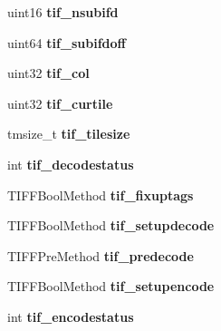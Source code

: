 \begin{DoxyCompactItemize}
\item 
\hypertarget{structtiff_add50e831319fc57d4c824f9851f96de6}{}uint16 {\bfseries tif\+\_\+nsubifd}\label{structtiff_add50e831319fc57d4c824f9851f96de6}

\item 
\hypertarget{structtiff_aa7644eeba259beb5588fd4fa606c94e3}{}uint64 {\bfseries tif\+\_\+subifdoff}\label{structtiff_aa7644eeba259beb5588fd4fa606c94e3}

\item 
\hypertarget{structtiff_aaa263854f7878e18dc08f1308d0774fe}{}uint32 {\bfseries tif\+\_\+col}\label{structtiff_aaa263854f7878e18dc08f1308d0774fe}

\item 
\hypertarget{structtiff_a56d55d1a628c741555423113efb609f1}{}uint32 {\bfseries tif\+\_\+curtile}\label{structtiff_a56d55d1a628c741555423113efb609f1}

\item 
\hypertarget{structtiff_a04cae7427954fc70e903a601486daf17}{}tmsize\+\_\+t {\bfseries tif\+\_\+tilesize}\label{structtiff_a04cae7427954fc70e903a601486daf17}

\item 
\hypertarget{structtiff_a1fc9647464968f5557456f0dd1501b91}{}int {\bfseries tif\+\_\+decodestatus}\label{structtiff_a1fc9647464968f5557456f0dd1501b91}

\item 
\hypertarget{structtiff_a1de296a43f523090ffc0ecd00237e619}{}T\+I\+F\+F\+Bool\+Method {\bfseries tif\+\_\+fixuptags}\label{structtiff_a1de296a43f523090ffc0ecd00237e619}

\item 
\hypertarget{structtiff_a85f66753c9ba6146ae353cb92df62e91}{}T\+I\+F\+F\+Bool\+Method {\bfseries tif\+\_\+setupdecode}\label{structtiff_a85f66753c9ba6146ae353cb92df62e91}

\item 
\hypertarget{structtiff_a3124277af17df86b8b5ca954f014a2e0}{}T\+I\+F\+F\+Pre\+Method {\bfseries tif\+\_\+predecode}\label{structtiff_a3124277af17df86b8b5ca954f014a2e0}

\item 
\hypertarget{structtiff_aefa42c9903c507b1b7ba244bfbe092e0}{}T\+I\+F\+F\+Bool\+Method {\bfseries tif\+\_\+setupencode}\label{structtiff_aefa42c9903c507b1b7ba244bfbe092e0}

\item 
\hypertarget{structtiff_a9f4a3280f09ee354cac026982b95ff1d}{}int {\bfseries tif\+\_\+encodestatus}\label{structtiff_a9f4a3280f09ee354cac026982b95ff1d}


\end{DoxyCompactItemize}
